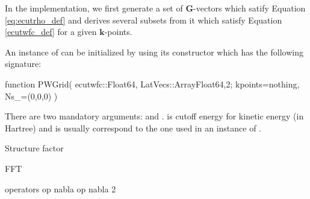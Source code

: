 In the implementation, we first generate a set of $\mathbf{G}$-vectors which satify
Equation \eqref{eq:ecutrho_def} and derives several subsets from it which
satisfy Equation \eqref{ecutwfc_def} for a given $\mathbf{k}$-points.

An instance of  can be initialized by using its constructor
which has the following signature:
\begin{juliacode}
function PWGrid( ecutwfc::Float64, LatVecs::Array{Float64,2};
    kpoints=nothing, Ns_=(0,0,0) )
\end{juliacode}
There are two mandatory arguments:  and .
 is cutoff energy for kinetic energy (in Hartree) and
 is usually correspond to the one used in an
instance of .

Structure factor

FFT

operators op nabla op nabla 2


